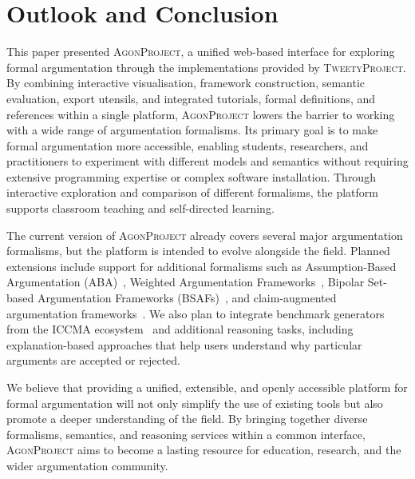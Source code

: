 \documentclass[
]{ceurart}
\newcommand{\agon}{\textsc{AgonProject}\xspace}
\newcommand{\tweety}{\textsc{TweetyProject}\xspace}
\begin{document}
\section{Outlook and Conclusion}\label{sec:outlook}

This paper presented \agon, a unified web-based interface for exploring formal argumentation through the implementations provided by \tweety. By combining interactive visualisation, framework construction, semantic evaluation, export utensils, and integrated tutorials, formal definitions, and references within a single platform, \agon lowers the barrier to working with a wide range of argumentation formalisms. Its primary goal is to make formal argumentation more accessible, enabling students, researchers, and practitioners to experiment with different models and semantics without requiring extensive programming expertise or complex software installation. Through interactive exploration and comparison of different formalisms, the platform supports classroom teaching and self-directed learning.

The current version of \agon already covers several major argumentation formalisms, but the platform is intended to evolve alongside the field. Planned extensions include support for additional formalisms such as Assumption-Based Argumentation (ABA)~\cite{DBLP:books/sp/09/DungKT09,DBLP:books/hofa/CyrasFST17}, Weighted Argumentation Frameworks~\cite{DBLP:journals/flap/Bistarelli021}, Bipolar Set-based Argumentation Frameworks (BSAFs)~\cite{DBLP:conf/kr/BertholdR024}, and claim-augmented argumentation frameworks~\cite{DBLP:conf/ecai/Rapberger20,DBLP:journals/ai/DvorakRW23}. We also plan to integrate benchmark generators from the ICCMA ecosystem~\cite{DBLP:journals/argcom/BistarelliKLLMRST25,DBLP:journals/ai/JarvisaloLN25} and additional reasoning tasks, including explanation-based approaches that help users understand why particular arguments are accepted or rejected.

We believe that providing a unified, extensible, and openly accessible platform for formal argumentation will not only simplify the use of existing tools but also promote a deeper understanding of the field. By bringing together diverse formalisms, semantics, and reasoning services within a common interface, \agon aims to become a lasting resource for education, research, and the wider argumentation community.
\end{document}

